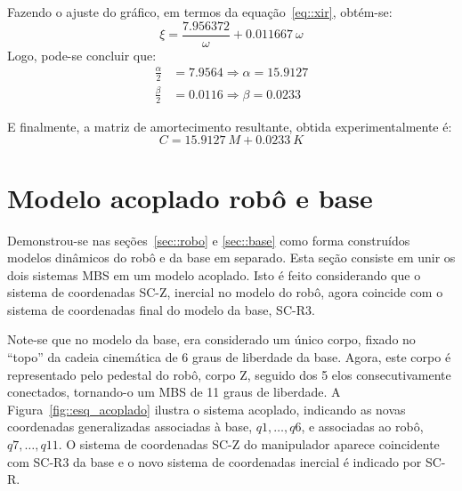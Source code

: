 
Fazendo o ajuste do gráfico, em termos da equação~\ref{eq::xir},
obtém-se:
%
\begin{equation}
	\xi = \frac{7.956372}{\omega} + 0.011667 ~\omega
\end{equation}
%
Logo, pode-se concluir que:
%
\begin{align}
	\frac{\alpha}{2} &= 7.9564 \Rightarrow  \alpha = 15.9127 \\
	\frac{\beta}{2} &= 0.0116 \Rightarrow  \beta = 0.0233
\end{align}
%

E finalmente, a matriz de amortecimento resultante, obtida experimentalmente é:
%
\begin{equation}
	C = 15.9127~M + 0.0233~K
\end{equation}
%



\section{Modelo acoplado robô e base} \label{sec::acoplado}

Demonstrou-se nas seções~\ref{sec::robo} e \ref{sec::base} como forma
construídos modelos dinâmicos do robô e da base em separado. Esta seção consiste
em unir os dois sistemas MBS em um modelo acoplado.
Isto é feito considerando que o sistema de coordenadas SC-Z, inercial no modelo
do robô, agora coincide com o sistema de coordenadas final do modelo da base,
SC-R3.

Note-se que no modelo da base, era considerado um único corpo, fixado no
``topo'' da cadeia cinemática de 6 graus de liberdade da base.
Agora, este corpo é representado pelo pedestal do robô, corpo Z, seguido dos 5
elos consecutivamente conectados, tornando-o um MBS de 11 graus de liberdade. A
Figura~\ref{fig::esq_acoplado} ilustra o sistema acoplado, indicando as novas
coordenadas generalizadas associadas à base, $q1,\ldots,q6$, e associadas ao
robô, $q7,\ldots,q11$. O sistema de coordenadas SC-Z do manipulador aparece
coincidente com SC-R3 da base e o novo sistema de coordenadas inercial é
indicado por SC-R.

